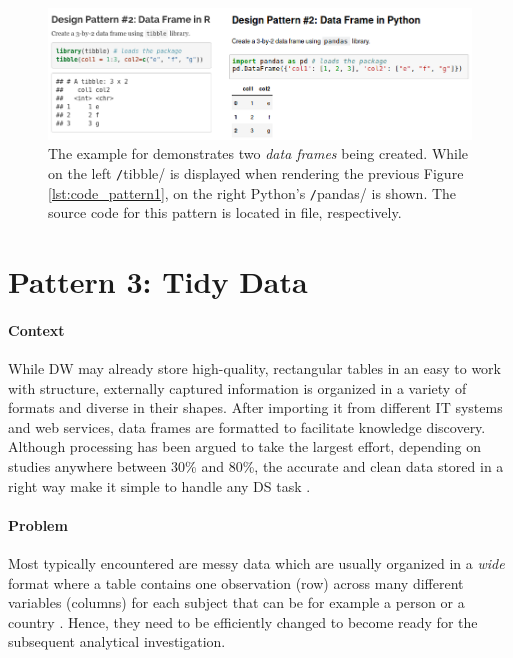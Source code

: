 \begin{figure}[!ht]
\centering
\includegraphics[width=\textwidth+2cm,height=\textheight,keepaspectratio]{images_dp/code_listing_2_df}
\caption[Example for Data Frame Design Pattern.]{The example for  demonstrates two \emph{data frames} being created. 
While on the left \texttt/tibble/ is displayed when rendering the previous Figure \ref{lst:code_pattern1}, on the right Python's \texttt/pandas/ is shown.
The source code for this pattern is located in  file,  respectively.}
\label{lst:code_pattern2}
\end{figure}

\section{Pattern 3: Tidy Data}

\paragraph*{Context}
While \ac{DW} may already store high-quality, rectangular tables in an easy to work with structure, externally captured information is organized in a variety of formats and diverse in their shapes.
After importing it from different \ac{IT} systems and web services, data frames are formatted to facilitate knowledge discovery.
Although processing has been argued to take the largest effort, depending on studies anywhere between 30\% and 80\%, the accurate and clean data stored in a right way make it simple to handle any \ac{DS} task \parencites{ThomasZeutschler2016ITAnalytics}{Taft2015}.

\paragraph*{Problem}
Most typically encountered are messy data which are usually organized in a \emph{wide} format where a table contains one observation (row) across many different variables (columns) for each subject that can be for example a person or a country \parencite{Boehmke2016DataR}. 
Hence, they need to be efficiently changed to become ready for the subsequent analytical investigation. 

